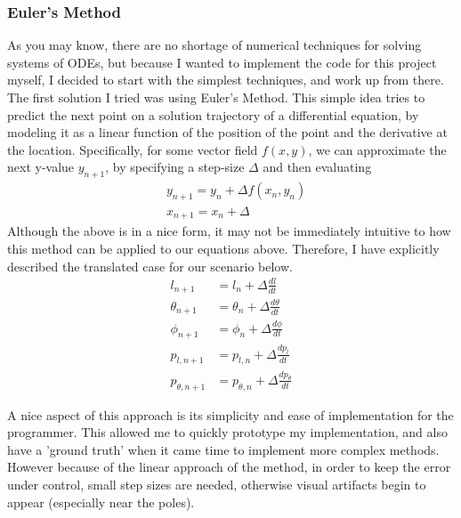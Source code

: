 \documentclass{article}
\begin{document}
\subsubsection{Euler's Method}
As you may know, there are no shortage of numerical techniques for solving systems of ODEs, but because I wanted to implement the code for this project myself, I decided to start with the simplest techniques, and work up from there. The first solution I tried was using Euler's Method. This simple idea tries to predict the next point on a solution trajectory of a differential equation, by modeling it as a linear function of the position of the point and the derivative at the location. Specifically, for some vector field $f(x,y)$, we can approximate the next y-value $y_{n+1}$, by specifying a step-size $\Delta$ and then evaluating
\begin{align*}
&\boxed{y_{n+1}=y_{n}+\Delta f(x_n,y_n)}\\
&x_{n+1} = x_n + \Delta
\end{align*}
Although the above is in a nice form, it may not be immediately intuitive to how this method can be applied to our equations above. Therefore, I have explicitly described the translated case for our scenario below.
\begin{align*}
l_{n+1}&=l_{n}+\Delta\frac{d l}{d t}\\
\theta_{n+1}&=\theta_{n}+\Delta\frac{d \theta}{d t}\\
\phi_{n+1}&=\phi_{n}+\Delta\frac{d \phi}{d t}\\
p_{l,n+1}&=p_{l,n}+\Delta\frac{d p_{l}}{d t}\\
p_{\theta,n+1}&=p_{\theta,n}+\Delta\frac{d p_{\theta}}{d t}
\end{align*}
\par A nice aspect of this approach is its simplicity and ease of implementation for the programmer. This allowed me to quickly prototype my implementation, and also have a 'ground truth' when it came time to implement more complex methods. However because of the linear approach of the method, in order to keep the error under control, small step sizes are needed, otherwise visual artifacts begin to appear (especially near the poles).
\end{document}
